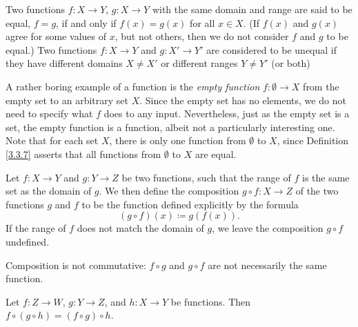 \begin{definition}\label{3.3.7}
Two functions \(f : X \to Y\), \(g : X \to Y\) with the same domain and range are said to be equal, \(f = g\), if and only if \(f(x) = g(x)\) for all \(x \in X\).
(If \(f(x)\) and \(g(x)\) agree for some values of \(x\), but not others, then we do not consider \(f\) and \(g\) to be equal.)
Two functions \(f: X \to Y\) and \(g: X' \to Y'\) are considered to be unequal if they have different domains \(X \neq X'\) or different ranges \(Y \neq Y'\) (or both)
\end{definition}

A rather boring example of a function is the \emph{empty function} \(f : \emptyset \to X\) from the empty set to an arbitrary set \(X\).
Since the empty set has no elements, we do not need to specify what \(f\) does to any input.
Nevertheless, just as the empty set is a set, the empty function is a function, albeit not a particularly interesting one.
Note that for each set \(X\), there is only one function from \(\emptyset\) to \(X\), since Definition \ref{3.3.7} asserts that all functions from \(\emptyset\) to \(X\) are equal.

\setcounter{theorem}{9}
\begin{definition}[Composition]\label{3.3.10}
Let \(f : X \to Y\) and \(g : Y \to Z\) be two functions, such that the range of \(f\) is the same set as the domain of \(g\).
We then define the composition \(g \circ f : X \to Z\) of the two functions \(g\) and \(f\) to be the function defined explicitly by the formula
\[
    (g \circ f)(x) \coloneqq g(f(x)).
\]
If the range of \(f\) does not match the domain of \(g\), we leave the composition \(g \circ f\) undefined.
\end{definition}

Composition is not commutative: \(f \circ g\) and \(g \circ f\) are not necessarily the same function.

\setcounter{theorem}{11}
\begin{lemma}\label{3.3.12}
Let \(f : Z \to W\), \(g : Y \to Z\), and \(h : X \to Y\) be functions.
Then \(f \circ (g \circ h) = (f \circ g) \circ h\).
\end{lemma}

